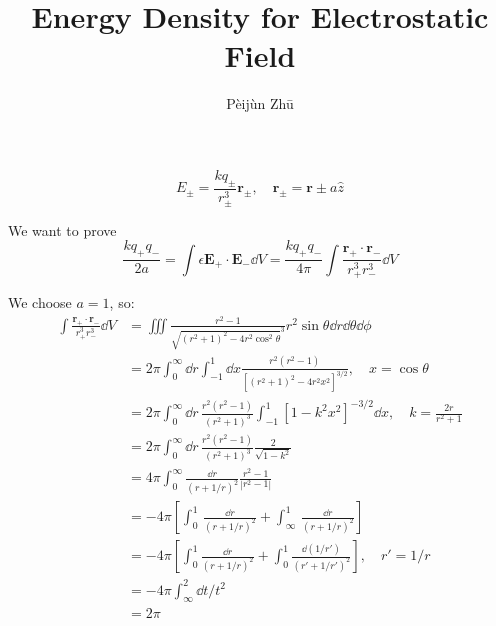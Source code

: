 \documentclass{article}
\title{Energy Density for Electrostatic Field}
\author{P\`eij\`un Zh\=u}
\begin{document}
\maketitle
\[E_\pm=\frac{kq_\pm}{r_\pm^3}\bm r_\pm,\quad \bm r_\pm=\bm r\pm a\hat z\]

We want to prove \[\frac{kq_+q_-}{2a}=\int\epsilon \bm E_+\cdot \bm E_-\dd V=\frac{kq_+q_-}{4\pi}\int  \frac{\bm r_+\cdot \bm r_-}{r_+^3r_-^3} \dd V\]

We choose $a=1$, so:
\begin{align}
\int\frac{\bm r_+\cdot \bm r_-}{r_+^3r_-^3}\dd V&=\iiint\frac{r^2-1}{\sqrt{(r^2+1)^2-4r^2\cos^2\theta}^3}r^2\sin\theta \dd r\dd\theta \dd\phi\\
&=2\pi\int_0^\infty\dd r\int_{-1}^{1}\dd x \frac{r^2(r^2-1)}{[(r^2+1)^2-4r^2x^2]^{3/2}}, \quad x=\cos\theta\\
&=2\pi\int_0^\infty\dd r\,\frac{r^2(r^2-1)}{(r^2+1)^3} \int_{-1}^1[1-k^2x^2]^{-3/2}\dd x, \quad k=\frac{2r}{r^2+1}\\
&=2\pi\int_0^\infty\dd r\,\frac{r^2(r^2-1)}{(r^2+1)^3} \frac{2}{\sqrt{1-k^2}}\\
&=4\pi\int_0^\infty\frac{\dd r}{(r+1/r)^2} \frac{r^2-1}{|r^2-1|}\\
&=-4\pi\left[\int_0^1\,\frac{\dd r}{(r+1/r)^2}+\int_{\infty}^1\,\frac{\dd r}{(r+1/r)^2}\right]\\
&=-4\pi\left[\int_0^1\frac{\dd r}{(r+1/r)^2}+\int_0^1\frac{\dd(1/r')}{(r'+1/r')^2}\right],\quad r'=1/r\\
&=-4\pi \int_\infty^2 \dd t/t^2\\
&=2\pi
\end{align}
\end{document}
